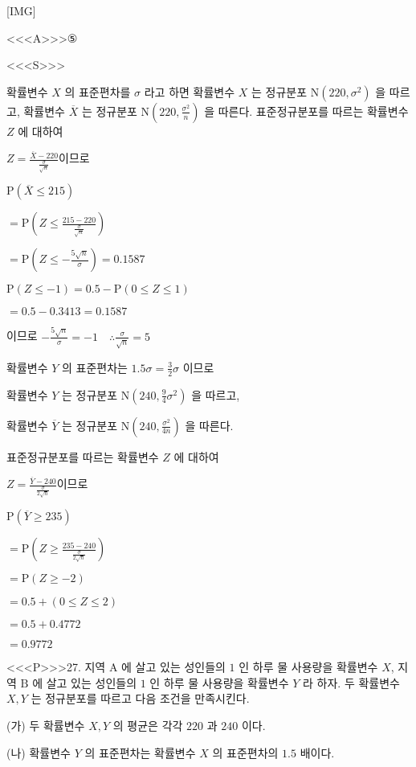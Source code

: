 \documentclass{oblivoir}
\begin{document}
[IMG]

<<<A>>>⑤

<<<S>>>



확률변수 $X$ 의 표준편차를 $\sigma$ 라고 하면
확률변수 $X$ 는 정규분포 $\mathrm{N}\left(220, \sigma^{2}\right)$ 을 따르고,
확률변수 $\overline{X}$ 는 정규분포 $\mathrm{N}\left(220, \frac{\sigma^{2}}{n}\right)$ 을 따른다.
표준정규분포를 따르는 확률변수 $Z$ 에 대하여

$Z=\frac{\overline{X}-220}{\frac{\sigma}{\sqrt{n}}}$이므로

$\mathrm{P}(\overline{X} \leq 215) $

$=\mathrm{P}\left(Z \leq \frac{215-220}{\frac{\sigma}{\sqrt{n}}}\right)$

$=\mathrm{P}\left(Z \leq-\frac{5 \sqrt{n}}{\sigma}\right)=0.1587$

$\mathrm{P}(Z \leq-1)=0.5-\mathrm{P}(0 \leq Z \leq 1)$

$= 0.5-0.3413=0.1587$

이므로 $-\frac{5 \sqrt{n}}{\sigma}=-1 \quad \therefore \frac{\sigma}{\sqrt{n}}=5$

확률변수 $Y$ 의 표준편차는 $1.5 \sigma=\frac{3}{2} \sigma$ 이므로

확률변수 $Y$ 는 정규분포 $\mathrm{N}\left(240, \frac{9}{4} \sigma^{2}\right)$ 을 따르고,

확률변수 $\overline{Y}$ 는 정규분포 $\mathrm{N}\left(240, \frac{\sigma^{2}}{4 n}\right)$ 을 따른다.

표준정규분포를 따르는 확률변수 $Z$ 에 대하여

$Z=\frac{\overline{Y}-240}{\frac{\sigma}{2 \sqrt{n}}}$이므로

$\mathrm{P}(\overline{Y} \geq 235) $

$=\mathrm{P}\left(Z \geq \frac{235-240}{\frac{\sigma}{2 \sqrt{n}}}\right)$

$=\mathrm{P}(Z \geq-2)$

$=0.5+(0 \leq Z \leq 2)$

$=0.5+0.4772$

$=0.9772$


<<<P>>>27. 지역 $\mathrm{A}$ 에 살고 있는 성인들의 $1$ 인 하루 물 사용량을 확률변수 $X$, 지역 $\mathrm{B}$ 에 살고 있는 성인들의 $1$ 인 하루 물 사용량을 확률변수 $Y$ 라 하자. 두 확률변수 $X, Y$ 는 정규분포를 따르고 다음 조건을 만족시킨다.

(가) 두 확률변수 $X, Y$ 의 평균은 각각 $220$ 과 $240$ 이다.

(나) 확률변수 $Y$ 의 표준편차는 확률변수 $X$ 의 표준편차의 $1.5$ 배이다.
\end{document}
